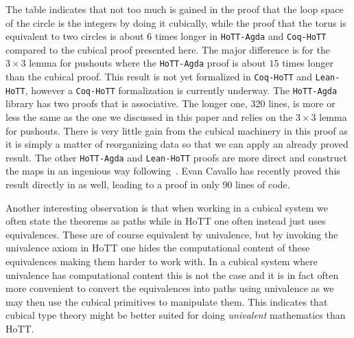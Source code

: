 The table indicates that not too much is gained in the proof that the
loop space of the circle is the integers by doing it cubically, while
the proof that the torus is equivalent to two circles is about $6$
times longer in \texttt{HoTT-Agda} and \texttt{Coq-HoTT} compared to the cubical proof
presented here. The major difference is for the $3 \times 3$ lemma for
pushouts where the \texttt{HoTT-Agda} proof is about $15$ times longer than the
cubical proof. This result is not yet formalized in \texttt{Coq-HoTT} and
\texttt{Lean-HoTT}, however a \texttt{Coq-HoTT} formalization is currently underway. The
\texttt{HoTT-Agda} library has two proofs that  is associative. The
longer one, 320 lines, is more or less the same as the one we
discussed in this paper and relies on the $3 \times 3$ lemma for
pushouts. There is very little gain from the cubical machinery in this
proof as it is simply a matter of reorganizing data so that we can
apply an already proved result. The other \texttt{HoTT-Agda} and \texttt{Lean-HoTT}
proofs are more direct and construct the maps in an ingenious way
following~. Evan Cavallo has recently
proved this result directly in \CubicalAgda as well, leading to a
proof in only 90 lines of code.

Another interesting observation is that when working in a cubical
system we often state the theorems as paths while in HoTT one often
instead just uses equivalences. These are of course equivalent by
univalence, but by invoking the univalence axiom in HoTT one hides the
computational content of these equivalences making them harder to work
with. In a cubical system where univalence has computational content
this is not the case and it is in fact often more convenient to
convert the equivalences into paths using univalence as we may then
use the cubical primitives to manipulate them. This indicates that
cubical type theory might be better suited for doing \emph{univalent}
mathematics than HoTT.

